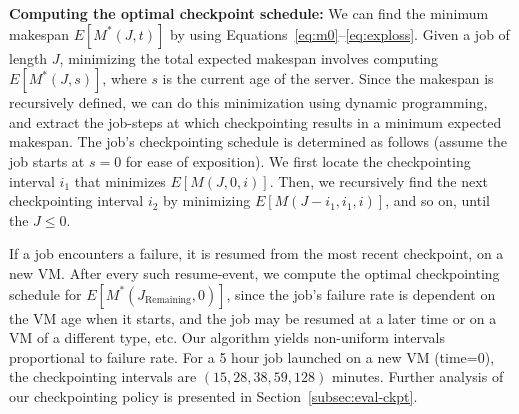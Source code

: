 \noindent \textbf{Computing the optimal checkpoint schedule:} We can find the minimum makespan $E[M^*(J, t)]$ by using Equations~\ref{eq:m0}--\ref{eq:exploss}. 
Given a job of length $J$, minimizing the total expected makespan involves computing $E[M^*(J, s)]$, where $s$ is the current age of the server. 
Since the makespan is recursively defined, we can do this minimization using dynamic programming, and extract the job-steps at which checkpointing results in a minimum expected makespan. 
The job's checkpointing schedule is determined as follows (assume the job starts at $s=0$ for ease of exposition). 
We first locate the checkpointing interval $i_1$ that minimizes $E[M(J,0,i)]$.  
Then, we recursively find the next checkpointing interval $i_2$ by minimizing  $E[M(J-i_1, i_1,i)]$, and so on, until the $J\leq0$. %

If a job encounters a failure, it is resumed from the most recent checkpoint, on a new VM.
After every such resume-event, we compute the optimal checkpointing schedule for $E[M^*(J_{\text{Remaining}}, 0)]$, since the job's failure rate is dependent on the VM age when it starts, and the job may be resumed at a later time or on a VM of a different type, etc.
Our algorithm yields non-uniform intervals proportional to failure rate.
For a 5 hour job launched on a new VM (time=0), the checkpointing intervals are $(15, 28, 38, 59, 128)$ minutes.
Further analysis of our checkpointing policy is presented in Section~\ref{subsec:eval-ckpt}. 



